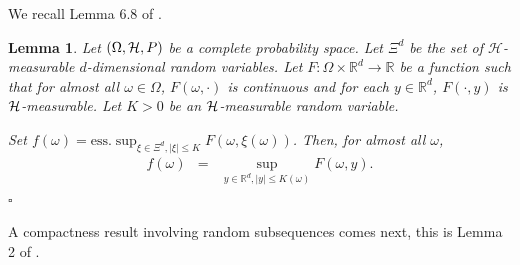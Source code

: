 \documentclass[a4paper]{article}
\newtheorem{lemma}[theorem]{Lemma}
\begin{document}
We recall Lemma 6.8 of \cite{laurence}.

\begin{lemma}
\label{gast}
Let $(\Omega, {\cal H},P)$ be a complete probability space. Let $\Xi^d$ be the set of 
$\mathcal{H}$-measurable $d$-dimensional random variables.
Let $F:\Omega\times\mathbb{R}^d\to\mathbb{R}$ be a function such that for almost all $\omega\in\Omega$,
$F(\omega,\cdot)$ is continuous and for each $y\in\mathbb{R}^d$, $F(\cdot,y)$ is ${\cal H}$-measurable. Let $K>0$ be
an ${\cal H} $-measurable random variable.

Set $f(\omega)=\mathrm{ess.}\sup_{\xi\in \Xi^d, |\xi|\leq  K} F(\omega,\xi(\omega))$.  Then,
for almost all $\omega$,
\begin{eqnarray}
\label{lavieestbienfaite2}
f(\omega) & = & \sup_{y \in \mathbb{R}^d, |y| \leq K(\omega) } F(\omega,y).
\end{eqnarray}
\hfill $\square$
\end{lemma}


A compactness result involving random subsequences comes next, this is Lemma 2 of \cite{ks}.
\end{document}
